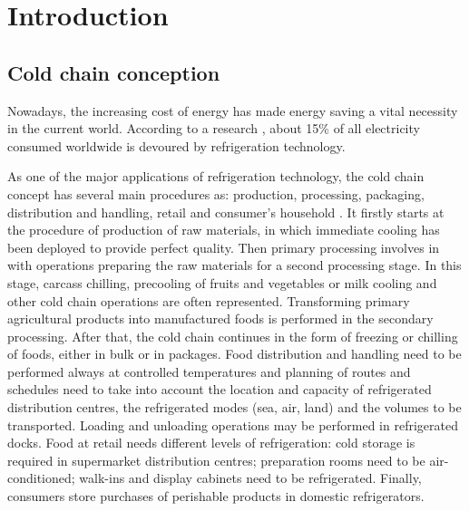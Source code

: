 \chapter*{Introduction}         %


\section{Cold chain conception}
Nowadays, the increasing cost of energy has made energy saving a vital necessity in the current world.
According to a research \citep{coulomb2008refrigeration}, about 15\% of all electricity consumed worldwide is devoured by refrigeration technology. 

As one of the major applications of refrigeration technology, the cold chain concept has several main procedures as: production, processing, packaging, distribution and handling, retail and consumer's household \citep{Estrada-Flores2010}. It firstly starts at the procedure of production of raw materials, in which immediate cooling has been deployed to provide perfect quality. Then primary processing involves in with operations preparing the raw materials for a second processing stage.  In this stage, carcass chilling, precooling of fruits and vegetables or milk cooling and other cold chain operations are often represented. Transforming primary agricultural products into manufactured foods is performed in the secondary processing. After that, the cold chain continues in the form of freezing or chilling of foods, either in bulk or in packages. Food distribution and handling need to be performed always at controlled temperatures and planning of routes and schedules need to take into account the location and capacity of refrigerated distribution centres, the refrigerated modes (sea, air, land) and the volumes to be transported. Loading and unloading operations may be performed in refrigerated docks. Food at retail needs different levels of refrigeration: cold storage is required in supermarket distribution centres; preparation rooms  need to be air-conditioned; walk-ins and display cabinets need to be refrigerated. Finally, consumers store purchases of perishable products in domestic refrigerators.

